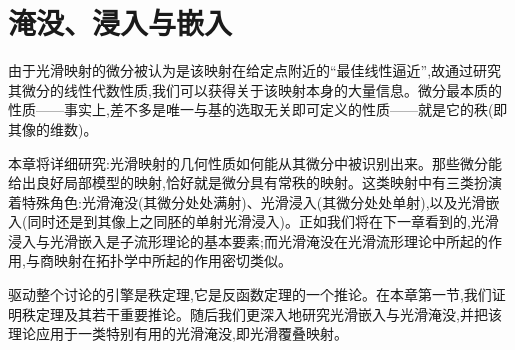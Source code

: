 \documentclass[../main.tex]{subfiles}
\begin{document}
\chapter{淹没、浸入与嵌入}\label{chapter:ch04-淹没浸入嵌入}

由于光滑映射的微分被认为是该映射在给定点附近的``最佳线性逼近'',故通过研究其微分的线性代数性质,我们可以获得关于该映射本身的大量信息。微分最本质的性质——事实上,差不多是唯一与基的选取无关即可定义的性质——就是它的秩(即其像的维数)。

本章将详细研究:光滑映射的几何性质如何能从其微分中被识别出来。那些微分能给出良好局部模型的映射,恰好就是微分具有常秩的映射。这类映射中有三类扮演着特殊角色:光滑淹没(其微分处处满射)、光滑浸入(其微分处处单射),以及光滑嵌入(同时还是到其像上之同胚的单射光滑浸入)。正如我们将在下一章看到的,光滑浸入与光滑嵌入是子流形理论的基本要素;而光滑淹没在光滑流形理论中所起的作用,与商映射在拓扑学中所起的作用密切类似。

驱动整个讨论的引擎是秩定理,它是反函数定理的一个推论。在本章第一节,我们证明秩定理及其若干重要推论。随后我们更深入地研究光滑嵌入与光滑淹没,并把该理论应用于一类特别有用的光滑淹没,即光滑覆叠映射。






\end{document}
